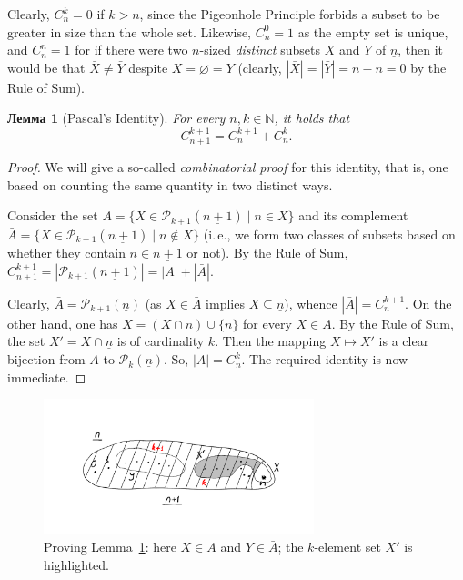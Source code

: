 \documentclass[12pt,notitlepage]{article}
\theoremstyle{plain}
\newtheorem{lemma}[thm]{Лемма}
\theoremstyle{definition}
\theoremstyle{plain}
\newcommand{\N}{\mathbb{N}}
\newcommand{\sbs}{\subseteq}
\newcommand{\void}{\varnothing}
\newcommand{\mP}{\mathcal{P}}
\newcommand{\ul}[1]{\underline{#1}}
\newcommand{\1}{\mathbf{1}}
\newcommand{\0}{\mathbf{0}}
\begin{document}
Clearly, $C_n^k = 0$ if $k > n$, since the Pigeonhole Principle forbids a subset to be greater in size than the whole set. Likewise, $C_n^0 = 1$ as the empty set is unique, and $C_n^n = 1$ for if there were two $n$-sized \emph{distinct} subsets $X$ and $Y$ of $\ul{n}$, then it would be that $\bar X \neq \bar Y$ despite $X = \void = Y$ (clearly, $|\bar X| = |\bar Y| = n - n = 0$ by the Rule of Sum).

\begin{lemma}[Pascal's Identity]\label{L11:pascal}
	For every $n, k \in \N$, it holds that
	$$C_{n + 1}^{k + 1} = C_n^{k + 1} + C^k_n.$$
\end{lemma}
\begin{proof} We will give a so-called \emph{combinatorial proof} for this identity, that is, one based on counting the same quantity in two distinct ways.
	
	Consider the set $A = \{ X \in \mP_{k + 1}(\ul{n+1}) \mid n \in X \}$ and its complement $\bar A = \{ X \in \mP_{k + 1}(\ul{n+1}) \mid n \notin X \}$ (i.\,e., we form two classes of subsets based on whether they contain $n \in \ul{n+1}$ or not). By the Rule of Sum, $C^{k+1}_{n+1} = |\mP_{k + 1}(\ul{n+1})| = |A| + |\bar A|$. 
	
	Clearly, $\bar A = \mP_{k + 1}(\ul{n})$ (as $X \in \bar A$ implies $X \sbs \ul{n}$), whence $|\bar A| = C_n^{k+1}$. On the other hand, one has $X = (X \cap \ul{n}) \cup \{ n \}$ for every $X \in A$. By the Rule of Sum, the set $X' = X \cap \ul{n}$ is of cardinality $k$. Then the mapping $X \mapsto X'$ is a clear bijection from $A$ to $\mP_k(\ul{n})$. So, $|A| = C_n^k$. The required identity is now immediate.
\end{proof}

\begin{figure}[h]
	\centering
	\includegraphics*[width=0.7\textwidth]{pascal.pdf}
	\caption{Proving Lemma~\ref{L11:pascal}: here $X \in A$ and $Y \in \bar A$; the $k$-element set $X'$ is highlighted.}
\end{figure}
\end{document}
